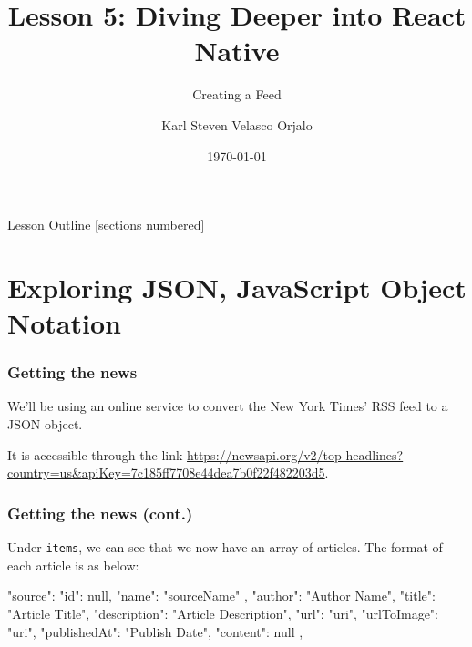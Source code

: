 \documentclass{beamer}
\title{Lesson 5: Diving Deeper into React Native}
\subtitle{Creating a Feed}
\date{\today}
\author{Karl Steven Velasco Orjalo}
\institute{React Native Quickstart}
\begin{document}
  \maketitle

  \begin{frame}{Lesson Outline}
    [sections numbered]
    \tableofcontents
  \end{frame}

  \section{Exploring JSON, JavaScript Object Notation}
  \begin{frame}[fragile]
    \frametitle{Getting the news}
    We'll be using an online service to convert the New York Times' RSS feed to a JSON object. 

    It is accessible through the link \url{https://newsapi.org/v2/top-headlines?country=us&apiKey=7c185ff7708e44dea7b0f22f482203d5}.
  \end{frame}
  \begin{frame}[fragile]
    \frametitle{Getting the news (cont.)}
    Under \verb|items|, we can see that we now have an array of articles. The format of each article is as below: 

    \begin{jscodesmall}
{
  "source": {
      "id": null,
      "name": "sourceName"
  },
  "author": "Author Name",
  "title": "Article Title",
  "description": "Article Description",
  "url": "uri",
  "urlToImage": "uri",
  "publishedAt": "Publish Date",
  "content": null
},
    \end{jscodesmall}
  \end{frame}
  
\end{document}
